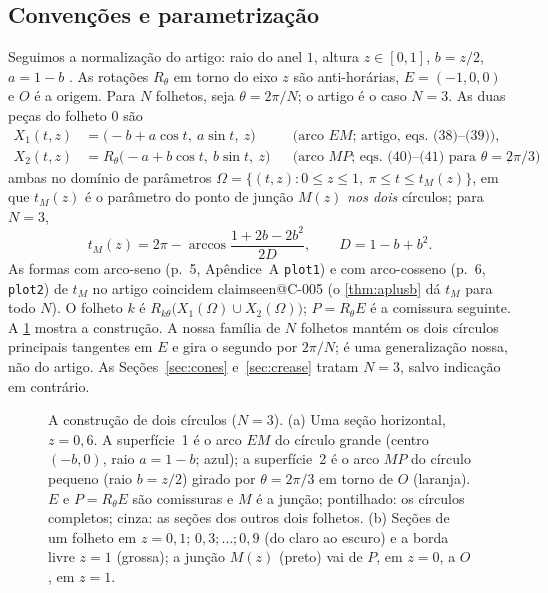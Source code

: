 \documentclass[11pt,a4paper]{article}
\makeatletter
\theoremstyle{plain}
\theoremstyle{remark}
\newcommand{\claim}[1]{\ifcsname claimseen@#1\endcsname\else\expandafter\gdef\csname claimseen@#1\endcsname{}\label{claim:#1}\fi}
\makeatother
\begin{document}
\subsection{Convenções e parametrização}
Seguimos a normalização do artigo: raio do anel $1$, altura $z\in[0,1]$, $b=z/2$, $a=1-b$ \citep[eq.~(29) e a prova da
Prop.~1]{McKee2026}. As rotações $R_\theta$ em torno do eixo $z$ são anti-horárias, $E=(-1,0,0)$ e $O$ é a origem. Para $N$
folhetos, seja $\theta=2\pi/N$; o artigo é o caso $N=3$. As duas peças do folheto $0$ são
\begin{align}
X_1(t,z) &= \big(-b+a\cos t,\ a\sin t,\ z\big) &&\text{(arco $EM$; artigo, eqs.~(38)--(39))},\label{eq:X1}\\
X_2(t,z) &= R_\theta\big(-a+b\cos t,\ b\sin t,\ z\big) &&\text{(arco $MP$; eqs.~(40)--(41) para $\theta=2\pi/3$)},\label{eq:X2}
\end{align}
ambas no domínio de parâmetros $\Omega=\{(t,z): 0\le z\le 1,\ \pi\le t\le t_M(z)\}$, em que $t_M(z)$ é o parâmetro do ponto
de junção $M(z)$ \emph{nos dois} círculos; para $N=3$,
\[ t_M(z)=2\pi-\arccos\frac{1+2b-2b^2}{2D},\qquad D=1-b+b^2 . \]
As formas com arco-seno (p.~5, Apêndice~A \texttt{plot1}) e com arco-cosseno (p.~6, \texttt{plot2}) de $t_M$ no artigo
coincidem \claim{C-005} (o \cref{thm:aplusb} dá $t_M$ para todo $N$). O folheto $k$ é
$R_{k\theta}\big(X_1(\Omega)\cup X_2(\Omega)\big)$; $P=R_\theta E$ é a comissura seguinte. A \cref{fig:construction} mostra a
construção. A nossa família de $N$ folhetos mantém os dois círculos principais tangentes em $E$ e gira o segundo por $2\pi/N$;
é uma generalização nossa, não do artigo. As Seções~\ref{sec:cones} e~\ref{sec:crease} tratam $N=3$, salvo indicação em
contrário.

\begin{figure}[t]\centering

\caption{A construção de dois círculos ($N=3$). (a) Uma seção horizontal, $z=0{,}6$. A superfície~1 é o arco $EM$ do círculo
grande (centro $(-b,0)$, raio $a=1-b$; azul); a superfície~2 é o arco $MP$ do círculo pequeno (raio $b=z/2$) girado por
$\theta=2\pi/3$ em torno de $O$ (laranja). $E$ e $P=R_\theta E$ são comissuras e $M$ é a junção; pontilhado: os círculos
completos; cinza: as seções dos outros dois folhetos. (b) Seções de um folheto em $z=0{,}1;\,0{,}3;\dots;0{,}9$ (do claro ao
escuro) e a borda livre $z=1$ (grossa); a junção $M(z)$ (preto) vai de $P$, em $z=0$, a $O$, em $z=1$.}
\label{fig:construction}
\end{figure}
\end{document}
